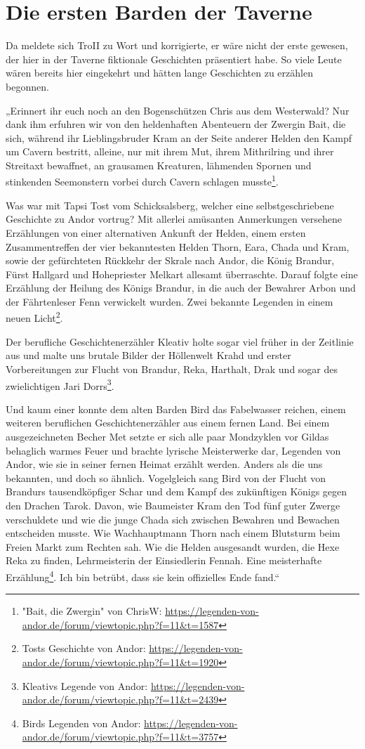 \newpage
\section{Die ersten Barden der Taverne}


Da meldete sich TroII zu Wort und korrigierte, er wäre nicht der erste gewesen, der hier in der Taverne fiktionale Geschichten präsentiert habe. So viele Leute wären bereits hier eingekehrt und hätten lange Geschichten zu erzählen begonnen.

„Erinnert ihr euch noch an den Bogenschützen Chris aus dem Westerwald? Nur dank ihm erfuhren wir von den heldenhaften Abenteuern der Zwergin Bait, die sich, während ihr Lieblingsbruder Kram an der Seite anderer Helden den Kampf um Cavern bestritt, alleine, nur mit ihrem Mut, ihrem Mithrilring und ihrer Streitaxt bewaffnet, an grausamen Kreaturen, lähmenden Spornen und stinkenden Seemonstern vorbei durch Cavern schlagen musste\footnote{"Bait, die Zwergin" von ChrisW: \url{https://legenden-von-andor.de/forum/viewtopic.php?f=11&t=1587}}.

Was war mit Tapsi Tost vom Schicksalsberg, welcher eine selbstgeschriebene Geschichte zu Andor vortrug? Mit allerlei amüsanten Anmerkungen versehene Erzählungen von einer alternativen Ankunft der Helden, einem ersten Zusammentreffen der vier bekanntesten Helden Thorn, Eara, Chada und Kram, sowie der gefürchteten Rückkehr der Skrale nach Andor, die König Brandur, Fürst Hallgard und Hohepriester Melkart allesamt überraschte. Darauf folgte eine Erzählung der Heilung des Königs Brandur, in die auch der Bewahrer Arbon und der Fährtenleser Fenn verwickelt wurden. Zwei bekannte Legenden in einem neuen Licht\footnote{Tosts Geschichte von Andor: \url{https://legenden-von-andor.de/forum/viewtopic.php?f=11&t=1920}}.

Der berufliche Geschichtenerzähler Kleativ holte sogar viel früher in der Zeitlinie aus und malte uns brutale Bilder der Höllenwelt Krahd und erster Vorbereitungen zur Flucht von Brandur, Reka, Harthalt, Drak und sogar des zwielichtigen Jari Dorrs\footnote{Kleativs Legende von Andor: \url{https://legenden-von-andor.de/forum/viewtopic.php?f=11&t=2439}}.

Und kaum einer konnte dem alten Barden Bird das Fabelwasser reichen, einem weiteren beruflichen Geschichtenerzähler aus einem fernen Land. Bei einem ausgezeichneten Becher Met setzte er sich alle paar Mondzyklen vor Gildas behaglich warmes Feuer und brachte lyrische Meisterwerke dar, Legenden von Andor, wie sie in seiner fernen Heimat erzählt werden. Anders als die uns bekannten, und doch so ähnlich. Vogelgleich sang Bird von der Flucht von Brandurs tausendköpfiger Schar und dem Kampf des zukünftigen Königs gegen den Drachen Tarok. Davon, wie Baumeister Kram den Tod fünf guter Zwerge verschuldete und wie die junge Chada sich zwischen Bewahren und Bewachen entscheiden musste. Wie Wachhauptmann Thorn nach einem Blutsturm beim Freien Markt zum Rechten sah. Wie die Helden ausgesandt wurden, die Hexe Reka zu finden, Lehrmeisterin der Einsiedlerin Fennah. Eine meisterhafte Erzählung\footnote{Birds Legenden von Andor: \url{https://legenden-von-andor.de/forum/viewtopic.php?f=11&t=3757}}. Ich bin betrübt, dass sie kein offizielles Ende fand.“

